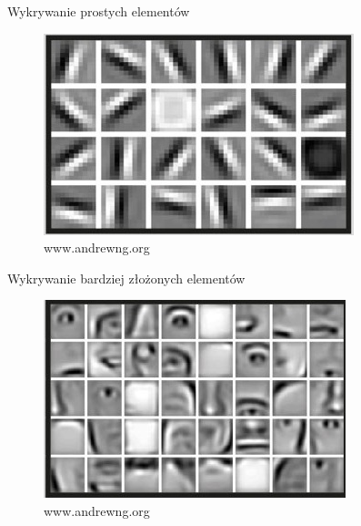 \documentclass[xcolor=dvipsnames]{beamer}
\begin{document}
\begin{frame}{Wykrywanie prostych elementów}
	\begin{figure}
		\includegraphics[width=\linewidth, height=0.7\textheight, keepaspectratio] {img/hierarchical-learning2.jpg}
		\caption{www.andrewng.org}
	\end{figure}
\end{frame}
\begin{frame}{Wykrywanie bardziej złożonych elementów }
	\begin{figure}
		\includegraphics[width=\linewidth, height=0.7\textheight, keepaspectratio] {img/hierarchical-learning3.jpg}
		\caption{www.andrewng.org}
	\end{figure}
\end{frame}
\end{document}
